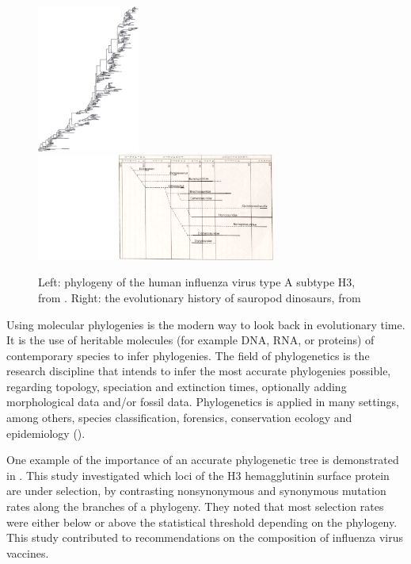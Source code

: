 \begin{figure}[H]
  \includegraphics[width=0.3\textwidth]{bush_et_al_1999}
  \includegraphics[width=0.7\textwidth]{dinosaur_phylogeny.png}
  \caption{
    Left: phylogeny of the human influenza virus type A subtype H3,
    from \cite{bush1999positive}.
    Right: the evolutionary history of sauropod dinosaurs,
    from \cite{upchurch1995evolutionary}
  }
  \label{fig:bush_et_al_1999}
\end{figure}

Using molecular phylogenies is the modern way to look back in evolutionary time.
It is the use of heritable molecules (for example DNA, RNA, or proteins)  
of contemporary species to infer phylogenies. 
The field of phylogenetics is the research discipline that
intends to infer the most accurate phylogenies possible, 
regarding topology, speciation and extinction times,
optionally adding morphological data and/or fossil data.
Phylogenetics is applied in many settings, among
others, species classification,
forensics, conservation ecology
and epidemiology (\cite{lam2010use}).

One example of the importance of an accurate phylogenetic tree 
is demonstrated in \cite{bush1999positive}. This study
investigated which loci of the H3 hemagglutinin surface protein
are under selection, by contrasting nonsynonymous and synonymous
mutation rates along the branches of a phylogeny. 
They noted that
most selection rates were either below or above the 
statistical threshold depending on the phylogeny.
This study contributed to recommendations on the 
composition of influenza virus vaccines.


